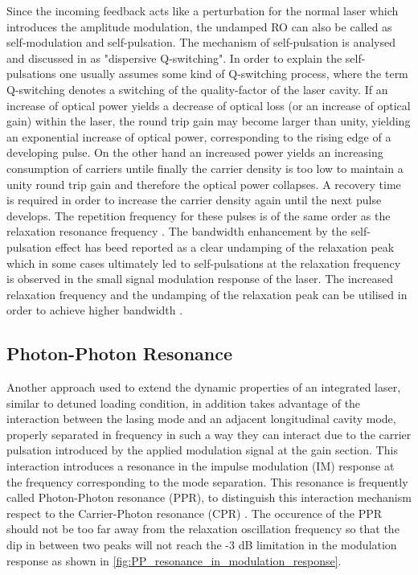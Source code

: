 Since the incoming feedback acts like a perturbation for the normal laser which introduces the amplitude modulation, the undamped RO can also be called as self-modulation and self-pulsation. The mechanism of self-pulsation is analysed and discussed in \cite{bandelow1993theory} as "dispersive Q-switching". In order to explain the self-pulsations one usually assumes some kind of Q-switching process, where the term Q-switching denotes a switching of the quality-factor of the laser cavity. If an increase of optical power yields a decrease of optical loss (or an increase of optical gain) within the laser, the round trip gain may become larger than unity, yielding an exponential increase of optical power, corresponding to the rising edge of a developing pulse. On the other hand an increased power yields an increasing consumption of carriers untile finally the carrier density is too low to maintain a unity round trip gain and therefore the optical power collapses. A recovery time is required in order to increase the carrier density again until the next pulse develops. The repetition frequency for these pulses is of the same order as the relaxation resonance frequency \cite{petermann2012laser}. The bandwidth enhancement by the self-pulsation effect has beed reported as a clear undamping of the relaxation peak which in some cases ultimately led to self-pulsations at the relaxation frequency is observed in the small signal modulation response of the laser. The increased relaxation frequency and the undamping of the relaxation peak can be utilised in order to achieve higher bandwidth \cite{schatz1996enhanced}.

\subsection{Photon-Photon Resonance}\label{subsec:pp_resonance}
Another approach used to extend the dynamic properties of an integrated laser, similar to detuned loading condition, in addition takes advantage of the interaction between the lasing mode and an adjacent longitudinal cavity mode, properly separated in frequency in such a way they can interact due to the carrier pulsation introduced by the applied modulation signal at the gain section. This interaction introduces a resonance in the impulse modulation (IM) response at the frequency corresponding to the mode separation. This resonance is frequently called Photon-Photon resonance (PPR), to distinguish this interaction mechanism respect to the Carrier-Photon resonance (CPR) \cite{montrosset2014laser}. The occurence of the PPR should not be too far away from the relaxation oscillation frequency so that the dip in between two peaks will not reach the -3 dB limitation in the modulation response as shown in \autoref{fig:PP_resonance_in_modulation_response}.

